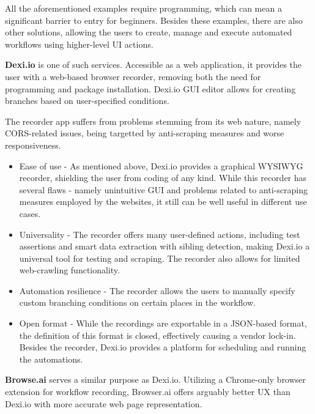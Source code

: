 \emptyline

All the aforementioned examples require programming, which can mean a significant barrier to entry for beginners.
Besides these examples, there are also other solutions, allowing the users to create, manage and execute automated workflows using higher-level UI actions.

\emptyline

\textbf{Dexi.io} is one of such services. 
Accessible as a web application, it provides the user with a web-based browser recorder, removing both the need for programming and package installation.
Dexi.io \ac{GUI} editor allows for creating branches based on user-specified conditions.

The recorder app suffers from problems stemming from its web nature, namely \acs{CORS}-related issues, being targetted by anti-scraping measures and worse responsiveness.

\begin{itemize}
    \item Ease of use - As mentioned above, Dexi.io provides a graphical \acs{WYSIWYG} recorder, shielding the user from coding of any kind.
    While this recorder has several flaws - namely unintuitive \ac{GUI} and problems related to anti-scraping measures employed by the websites, it still can be well useful in different use cases.

    \item Universality - The recorder offers many user-defined actions, including test assertions and smart data extraction with sibling detection, making Dexi.io a universal tool for testing and scraping. 
    The recorder also allows for limited web-crawling functionality.

    \item Automation resilience -
    The recorder allows the users to manually specify custom branching conditions on certain places in the workflow.
    
    \item Open format - While the recordings are exportable in a JSON-based format, the definition of this format is closed, effectively causing a vendor lock-in.
    Besides the recorder, Dexi.io provides a platform for scheduling and running the automations.
\end{itemize}

\textbf{Browse.ai} serves a similar purpose as Dexi.io.
Utilizing a Chrome-only browser extension for workflow recording, Browser.ai offers arguably better \ac{UX} than Dexi.io with more accurate web page representation.

